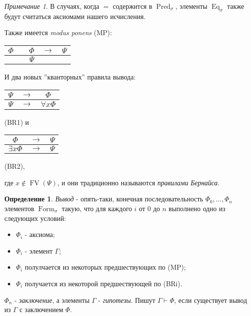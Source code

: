 \documentclass[a4paper,100pt]{article}
\theoremstyle{indented}
\theoremstyle{definition}
\newtheorem{defn}{Определение}
\theoremstyle{remark}
\newtheorem{remark}{Примечание}
\DeclareMathOperator{\form}{Form}
\DeclareMathOperator{\Pred}{Pred}
\DeclareMathOperator{\FV}{FV}
\DeclareMathOperator{\Eq}{Eq}
\begin{document}
\begin{remark}
  В случаях, когда $=$ содержится в $\Pred_\sigma$, элементы $\Eq_\sigma$ также будут считаться аксиомами нашего исчисления.
\end{remark}

Также имеется \textit{modus ponens} (MP):

\begin{center}
  \begin{tabular}{c c c c c}
    $\Phi$ & & $\Phi$ & $\rightarrow$ & $\Psi$ \\ 
    \hline
    & & $\Psi$ & & 
  \end{tabular}
\end{center}

И два новых ''кванторных'' правила вывода:

\begin{center}
  \begin{tabular}{c c c}
    $\Psi$ & $\rightarrow$ & $\Phi$ \\ 
    \hline
    $\Psi$ & $\rightarrow$ & $\forall x \Phi$
  \end{tabular}
  (BR1)\: \:\: \: и \: \: \: \:
  \begin{tabular}{c c c}
    $\Phi$ & $\rightarrow$ & $\Psi$ \\ 
    \hline
    $\exists x \Phi$ & $\rightarrow$ & $\Psi$ 
  \end{tabular}
  (BR2), 
\end{center}

где $x \notin \FV(\Psi)$, и они традиционно называются \textit{правилами Бернайса}.

\begin{defn}
  \textit{Вывод} - опять-таки, конечная последовательность $\Phi_0, \ldots, \Phi_n$ элементов $\form_\sigma$ такую, что для каждого $i$ от 0 до $n$ выполнено одно из следующих условий:

  \begin{itemize}
    \item $\Phi_i$ - аксиома; 
    \item $\Phi_i$ - элемент $\Gamma$; 
    \item $\Phi_i$ полулчается из некоторых предшествующих по (MP);
    \item $\Phi_i$ получается из некоторой предшествующей по (BRi). 
  \end{itemize}

  $\Phi_n$ - \textit{заключение}, а элементы $\Gamma$ - \textit{гипотезы}. Пишут $\Gamma \vdash \Phi$, если существует вывод из $\Gamma$ с заключением $\Phi$. 
\end{defn}
\end{document}
